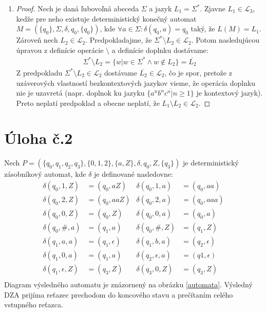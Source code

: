 \documentclass[10pt]{article}
\begin{document}
\begin{enumerate}
\item 
    \begin{proof}
        Nech je daná ľubovoľná abeceda $\Sigma$ a jazyk $L_1 = \Sigma^*$. Zjavne $L_1 \in
        \mathcal{L}_3$, kedže pre neho  existuje deterministický konečný automat $M =
        (\{q_0\},\Sigma, \delta, q_0, \{q_0\})$, kde $\forall a \in \Sigma : \delta(q_0, a) =
        q_0$ taký, že $L(M) = L_1$.
    Zároveň nech $L_2 \in \mathcal{L}_2$. Predpokladajme, že $\Sigma^* \setminus L_2 \in \mathcal{L}_2$. Potom nasledujúcou úpravou
        z definície operácie $\setminus $ a definície doplnku dostávame:
        \begin{align*}
            \Sigma^* \setminus L_2 = \{w | w \in \Sigma^* \land w \notin L_2 \} = \overline{L_2} 
        \end{align*}
        Z predpokladu $ \Sigma^* \setminus L_2 \in \mathcal{L}_2$ dostávame $\overline{L_2} \in
        \mathcal{L}_2$, čo je spor, pretože z uzáverových vlastností bezkontextových jazykov vieme,
        že operácia doplnku nie je uzavretá (napr. doplnok ku jazyku
        $\overline{\{a^nb^nc^n|n\geq1\}}$
        je kontextový jazyk). Preto neplatí predpoklad a obecne neplatí, že $L_1 \setminus L_2 \in
        \mathcal{L}_2$.
    \end{proof}
\end{enumerate}
\section*{Úloha č.2}
    Nech $P = (\{q_0, q_1, q_2, q_3\}, \{0,1,2\}, \{a,Z\}, \delta, q_0, Z, \{q_3\})$ je deterministický zásobníkový automat, kde
    $\delta$ je definované nasledovne:
    \begin{align*}
        \delta (q_0, 1, Z) &= (q_0, aZ)  & \delta (q_0, 1, a) &= (q_0, aa)\\
        \delta (q_0, 2, Z) &= (q_0, aaZ) & \delta (q_0, 2, a) &= (q_0, aaa)\\
        \delta (q_0, 0, Z) &= (q_0, Z)   & \delta (q_0, 0, a) &= (q_0, a)\\
        \delta (q_0, \#, a) &= (q_1, a)   & \delta (q_0, \#, Z) &= (q_1, Z)\\
        \delta (q_1, a, a) &= (q_1, \epsilon) & \delta (q_1, b, a) &= (q_2, \epsilon)\\
        \delta (q_1, 0, a) &= (q_1, a)   & \delta (q_2, \epsilon, a) &= (q1, \epsilon)\\
        \delta (q_1, \epsilon, Z) &= (q_3, Z) & \delta (q_3,0, Z) &= (q_3, Z)\\
    \end{align*}
    Diagram výsledného automatu je znázornený na obrázku \ref{automata}. Výsledný DZA prijíma
    reťazec prechodom do koncového stavu a prečítaním celého vstupného reťazca.
\end{document}
